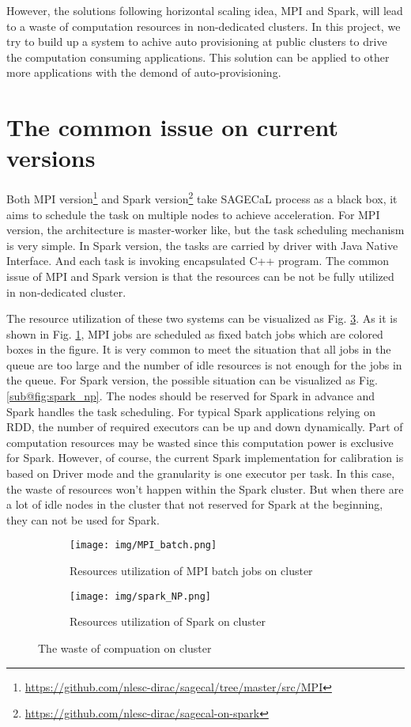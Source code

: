\documentclass[sigchi]{acmart}
\begin{document}
However, the solutions following horizontal scaling idea, MPI and Spark, will lead to a waste of computation resources in non-dedicated clusters.
In this project, we try to build up a system to achive auto provisioning at public clusters to drive the computation consuming applications. This solution can be applied to other more applications with the demond of auto-provisioning.

\section{The common issue on current versions}
Both MPI version\footnote{\url{https://github.com/nlesc-dirac/sagecal/tree/master/src/MPI}} and Spark version\footnote{\url{https://github.com/nlesc-dirac/sagecal-on-spark}} take SAGECaL process as a black box, it aims to schedule the task on multiple nodes to achieve acceleration. 
For MPI version, the architecture is master-worker like, but the task scheduling mechanism is very simple. In Spark version, the tasks are carried by driver with Java Native Interface. And each task is invoking encapsulated C++ program.
The common issue of MPI and Spark version is that the resources can be not be fully utilized in non-dedicated cluster. 

The resource utilization of these two systems can be visualized as Fig. \ref{fig:waste_cluster}. As it is shown in Fig. \ref{fig:MPI_batch}, MPI jobs are scheduled as fixed batch jobs which are colored boxes in the figure. It is very common to meet the situation that all jobs in the queue are too large and the number of idle resources is not enough for the jobs in the queue. 
For Spark version, the possible situation can be visualized as Fig. \ref{sub@fig:spark_np}. The nodes should be reserved for Spark in advance and Spark handles the task scheduling. For typical Spark applications relying on RDD, the number of required executors can be up and down dynamically. Part of computation resources may be wasted since this computation power is exclusive for Spark.
However, of course, the current Spark implementation for calibration is based on Driver mode and the granularity is one executor per task. In this case, the waste of resources won't happen within the Spark cluster. But when there are a lot of idle nodes in the cluster that not reserved for Spark at the beginning, they can not be used for Spark. 
\begin{figure}
  \begin{subfigure}[b]{0.45\textwidth}
      \texttt{[image: img/MPI\_batch.png]}
      \caption{Resources utilization of MPI batch jobs on cluster}
      \label{fig:MPI_batch}
  \end{subfigure}
  \begin{subfigure}[b]{0.45\textwidth}
      \texttt{[image: img/spark\_NP.png]}
      \caption{Resources utilization of Spark on cluster}
      \label{fig:spark_np}
  \end{subfigure}
  \caption{The waste of compuation on cluster}\label{fig:waste_cluster}
\end{figure}


 
\newpage


\end{document}
